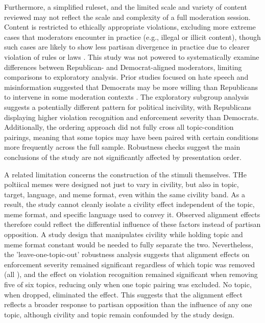 \documentclass[12pt]{article}
\begin{document}
Furthermore, a simplified ruleset, and the limited scale and variety of content reviewed may not reflect the scale and complexity of a full moderation session. Content is restricted to ethically appropriate violations, excluding more extreme cases that moderators encounter in practice (e.g., illegal or illicit content), though such cases are likely to show less partisan divergence in practice due to clearer violation of rules or laws \parencite{kozyrevaResolvingContentModeration2023}. This study was not powered to systematically examine differences between Republican- and Democrat-aligned moderators, limiting comparisons to exploratory analysis. Prior studies focused on hate speech and misinformation suggested that Democrats may be more willing than Republicans to intervene in some moderation contexts \parencite{appelPartisanConflictContent2023a,kozyrevaResolvingContentModeration2023,solomonIllusoryInterpartyDisagreement2024}. The exploratory subgroup analysis suggests a potentially different pattern for political incivility, with Republicans displaying higher violation recognition and enforcement severity than Democrats. Additionally, the ordering approach did not fully cross all topic-condition pairings, meaning that some topics may have been paired with certain conditions more frequently across the full sample. Robustness checks suggest the main conclusions of the study are not significantly affected by presentation order. 

A related limitation concerns the construction of the stimuli themselves. THe poltiical memes were designed not just to vary in civility, but also in topic, target, language, and meme format, even within the same civility band. As a result, the study cannot cleanly isolate a civility effect independent of the topic, meme format, and specific language used to convey it. Observed alignment effects therefore could reflect the differential influence of these factors instead of partisan opposition. A study design that manipulates civility while holding topic and meme format constant would be needed to fully separate the  two. Nevertheless, the 'leave-one-topic-out' robustness analysis suggests that alignment effects on enforcement severity remained significant regardless of which topic was removed (all \LeaveESAlignMaxP), and the effect on violation recognition remained
significant when removing five of six topics, reducing only when one topic pairing was excluded. No topic, when dropped, eliminated the effect. This suggests that the alignment effect reflects a broader response to partisan opposition than the influence of any one topic, although civility and topic remain confounded by the study design. 
\end{document}
